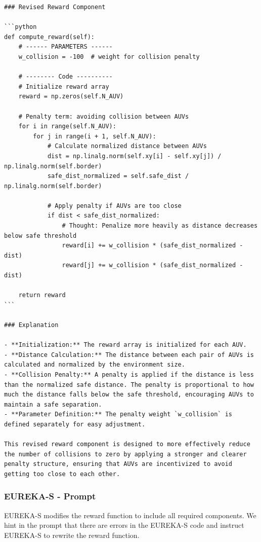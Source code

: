 \documentclass{article}
\begin{document}
\begin{verbatim}
### Revised Reward Component

```python
def compute_reward(self):
    # ------ PARAMETERS ------
    w_collision = -100  # weight for collision penalty

    # -------- Code ----------
    # Initialize reward array
    reward = np.zeros(self.N_AUV)

    # Penalty term: avoiding collision between AUVs
    for i in range(self.N_AUV):
        for j in range(i + 1, self.N_AUV):
            # Calculate normalized distance between AUVs
            dist = np.linalg.norm(self.xy[i] - self.xy[j]) / np.linalg.norm(self.border)
            safe_dist_normalized = self.safe_dist / np.linalg.norm(self.border)
            
            # Apply penalty if AUVs are too close
            if dist < safe_dist_normalized:
                # Thought: Penalize more heavily as distance decreases below safe threshold
                reward[i] += w_collision * (safe_dist_normalized - dist)
                reward[j] += w_collision * (safe_dist_normalized - dist)

    return reward
```

### Explanation

- **Initialization:** The reward array is initialized for each AUV.
- **Distance Calculation:** The distance between each pair of AUVs is calculated and normalized by the environment size.
- **Collision Penalty:** A penalty is applied if the distance is less than the normalized safe distance. The penalty is proportional to how much the distance falls below the safe threshold, encouraging AUVs to maintain a safe separation.
- **Parameter Definition:** The penalty weight `w_collision` is defined separately for easy adjustment.

This revised reward component is designed to more effectively reduce the number of collisions to zero by applying a stronger and clearer penalty structure, ensuring that AUVs are incentivized to avoid getting too close to each other.
\end{verbatim}

\subsubsection{EUREKA-S - Prompt}

EUREKA-S modifies the reward function to include all required components. We hint in the prompt that there are errors in the EUREKA-S code and instruct EUREKA-S to rewrite the reward function. 
\end{document}

